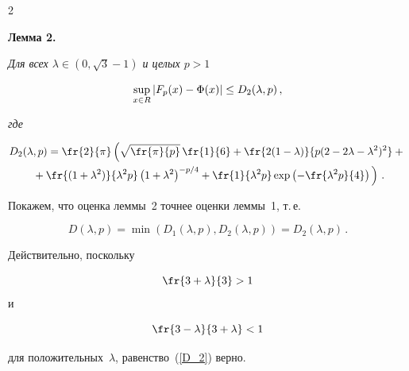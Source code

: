 \begin{multicols}{2}
\smallskip



\noindent

\textbf{Лемма 2.} %

\textit{Для всех $\lambda \in (0,\sqrt{3}-1)$ и целых $p >1$}

\begin{equation*}

\sup\limits_{x \in R} |F_p(x) - \IP(x)| \le D_2(\lambda,p)\,,

\end{equation*}

\textit{где}

\begin{multline*}

D_2(\lambda, p) =\fr{2}{\pi} \left( \sqrt{\fr{\pi}{p}}\,\fr{1}{6}

 +\fr{ 2 (1-\lambda)}{p(2-2\lambda-\lambda^2)^2}+ {}\right.\\

\left. {}+

 \fr{(1+

\lambda^2)}{\lambda^2 p} \left(1+\lambda^2\right)^{-p/4}

  + \fr{1}{\lambda^2 p} \exp \left(-\fr{\lambda^2 p}{4}\right)

  \vphantom{\sqrt{\fr{\pi}{p}}}

  \right)\,.

\end{multline*}



\smallskip



Покажем, что оценка леммы~2 точнее оценки леммы~1, т.\,е.\

\begin{equation}

D(\lambda,p) = \min\left(D_1(\lambda,p), D_2(\lambda,p)\right) = D_2(\lambda,p)\,.

 \label{D_2}

\end{equation}

Действительно, поскольку 

$$

\fr{3+\lambda}{3} > 1

$$ и 

$$

\fr{3-\lambda}{3+\lambda} < 1

$$ 

для положительных~$\lambda$, равенство~(\ref{D_2}) верно.




\end{multicols}
